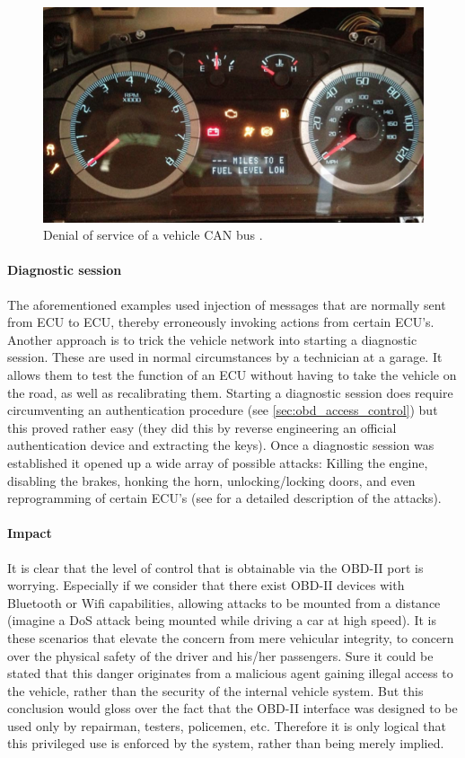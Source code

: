 \documentclass[master=cws,masteroption=vs,english]{kulemt}
\begin{document}
\begin{figure}[h]
	\label{fig:DoS}
	\centering
	\includegraphics[width=\textwidth]{DoS.png}
	\caption{Denial of service of a vehicle CAN bus \cite{MillerC}.}
\end{figure}

\paragraph{Diagnostic session} The aforementioned examples used injection of messages that are normally sent from ECU to ECU, thereby erroneously invoking actions from certain ECU's. Another approach is to trick the vehicle network into starting a diagnostic session. These are used in normal circumstances by a technician at a garage. It allows them to test the function of an ECU without having to take the vehicle on the road, as well as recalibrating them. Starting a diagnostic session does require circumventing an authentication procedure (see \ref{sec:obd_access_control}) but this proved rather easy (they did this by reverse engineering an official authentication device and extracting the keys). Once a diagnostic session was established it opened up a wide array of possible attacks: Killing the engine, disabling the brakes, honking the horn, unlocking/locking doors, and even reprogramming of certain ECU's (see \cite{MillerC} for a detailed description of the attacks).

\paragraph{Impact} It is clear that the level of control that is obtainable via the OBD-II port is worrying. Especially if we consider that there exist OBD-II devices with Bluetooth or Wifi capabilities, allowing attacks to be mounted from a distance (imagine a DoS attack being mounted while driving a car at high speed). It is these scenarios that elevate the concern from mere vehicular integrity, to concern over the physical safety of the driver and his/her passengers. Sure it could be stated that this danger originates from a malicious agent gaining illegal access to the vehicle, rather than the security of the internal vehicle system. But this conclusion would gloss over the fact that the OBD-II interface was designed to be used only by repairman, testers, policemen, etc. Therefore it is only logical that this privileged use is enforced by the system, rather than being merely implied.
\end{document}
